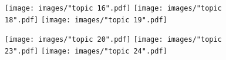 \documentclass[a4paper]{article}
\begin{document}
	\begin{figure}[h]
		\texttt{[image: images/"topic 16".pdf]}
		\endminipage\hfill
		\texttt{[image: images/"topic 18".pdf]}
		\endminipage\hfill
		\texttt{[image: images/"topic 19".pdf]}
		\endminipage
	\end{figure}

	\begin{figure}[h]
		\texttt{[image: images/"topic 20".pdf]}
		\endminipage\hfill
		\texttt{[image: images/"topic 23".pdf]}
		\endminipage\hfill
		\texttt{[image: images/"topic 24".pdf]}
		\endminipage
	\end{figure}
	
\end{document}
